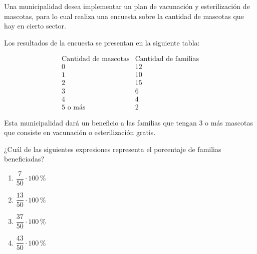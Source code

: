 \begin{problem}
    Una municipalidad desea implementar un plan de vacunación y esterilización de mascotas, para lo cual realiza una encuesta sobre la cantidad de mascotas que hay en cierto sector.

    Los resultados de la encuesta se presentan en la siguiente tabla:

    \[
    \begin{array}{c|c}
    \text{Cantidad de mascotas} & \text{Cantidad de familias} \\
    \hline
    0 & 12 \\
    1 & 10 \\
    2 & 15 \\
    3 & 6 \\
    4 & 4 \\
    5 \text{ o más} & 2
    \end{array}
    \]

    Esta municipalidad dará un beneficio a las familias que tengan 3 o más mascotas que consiste en vacunación o esterilización gratis.

    ¿Cuál de las siguientes expresiones representa el porcentaje de familias beneficiadas?

    \begin{enumerate}[label=\Alph*.]
        \item $\dfrac{7}{50} \cdot 100\,\%$
        \item $\dfrac{13}{50} \cdot 100\,\%$
        \item $\dfrac{37}{50} \cdot 100\,\%$
        \item $\dfrac{43}{50} \cdot 100\,\%$
    \end{enumerate}
\end{problem}
